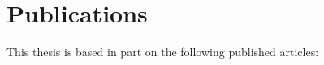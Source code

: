 \chapter*{Publications}
This thesis is based in part on the following published articles:
\section*{} 